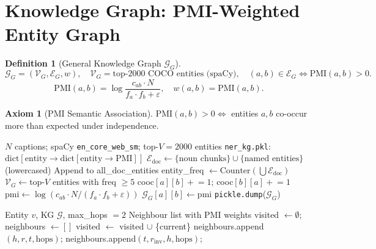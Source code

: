 \documentclass[12pt,a4paper]{article}
\theoremstyle{definition}
\newtheorem{definition}{Definition}[section]
\newtheorem{axiom}{Axiom}[section]
\theoremstyle{plain}
\theoremstyle{remark}
\newcommand{\KG}{\mathcal{G}}
\begin{document}
\section{Knowledge Graph: PMI-Weighted Entity Graph}
\label{sec:kg}

\begin{definition}[General Knowledge Graph $\KG_G$]
\[
  \KG_G = (\mathcal{V}_G, \mathcal{E}_G, w), \quad
  \mathcal{V}_G = \text{top-2000 COCO entities (spaCy)}, \quad
  (a,b) \in \mathcal{E}_G \Leftrightarrow \text{PMI}(a,b) > 0.
\]
\[
  \text{PMI}(a,b) = \log\frac{c_{ab} \cdot N}{f_a \cdot f_b + \varepsilon}, \quad w(a,b) = \text{PMI}(a,b).
\]
\end{definition}

\begin{axiom}[PMI Semantic Association]
$\text{PMI}(a,b) > 0 \Leftrightarrow$ entities $a, b$ co-occur more than expected under independence.
\end{axiom}

\begin{algorithm}[H]
\caption{Build NER Knowledge Graph (PMI-Weighted)}
\label{alg:kg_build}
\begin{algorithmic}[1]
\Require $N$ captions; spaCy \texttt{en\_core\_web\_sm}; top-$V = 2000$ entities
\Ensure \texttt{ner\_kg.pkl}: $\text{dict}[\text{entity} \to \text{dict}[\text{entity} \to \text{PMI}]]$
  \State $\mathcal{E}_{\text{doc}} \gets \{\text{noun chunks}\} \cup \{\text{named entities}\}$ (lowercased)
  \State Append to all\_doc\_entities
\EndFor
\State entity\_freq $\gets \text{Counter}(\bigcup \mathcal{E}_{\text{doc}})$
\State $\mathcal{V}_G \gets \text{top-}V$ entities with freq $\ge 5$
    \State cooc$[a][b] \mathrel{+}= 1$; cooc$[b][a] \mathrel{+}= 1$
  \EndFor
\EndFor
{}
    \State $\text{pmi} \gets \log(c_{ab} \cdot N / (f_a \cdot f_b + \varepsilon))$
     $\KG_G[a][b] \gets \text{pmi}$ \EndIf
  \EndFor
\EndFor
\State \texttt{pickle.dump}($\KG_G$)
\end{algorithmic}
\end{algorithm}

\begin{algorithm}[H]
\caption{KG Depth-First Neighbour Search (max-2-hop)}
\label{alg:kgdfs}
\begin{algorithmic}[1]
\Require Entity $v$, KG $\KG$, max\_hops $= 2$
\Ensure Neighbour list with PMI weights
\State visited $\gets \emptyset$; neighbours $\gets []$
\State {}
   \Return \EndIf
  \State visited $\gets$ visited $\cup$ \{current\}
  \ForEach{$(h, r, t) \in \KG$.relationships}
     neighbours.append$(h, r, t, \text{hops})$;  \EndIf
     neighbours.append$(t, r_{\text{inv}}, h, \text{hops})$;  \EndIf
  \EndFor
\EndProcedure
\end{algorithmic}
\end{algorithm}
\end{document}

